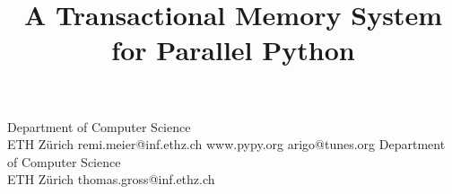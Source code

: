 \documentclass{sigplanconf}
\begin{document}
\setlength{\pdfpageheight}{\paperheight}
\setlength{\pdfpagewidth}{\paperwidth}






\title{A Transactional Memory System for Parallel Python}



           {Department of Computer Science\\ ETH Zürich}
           {remi.meier@inf.ethz.ch}
           {www.pypy.org}
           {arigo@tunes.org}
           {Department of Computer Science\\ ETH Zürich}
           {thomas.gross@inf.ethz.ch}

\maketitle
\end{document}
